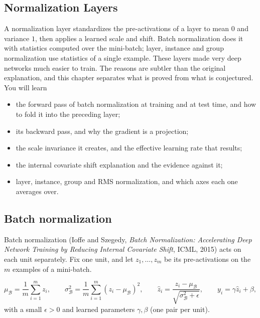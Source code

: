 \begin{notechapter}
\chapter{Normalization Layers}\label{ch:normalization}

\begin{chapterintro}
A normalization layer standardizes the pre-activations of a layer to mean $0$ and variance
$1$, then applies a learned scale and shift. Batch normalization does it with statistics
computed over the mini-batch; layer, instance and group normalization use statistics of a
single example. These layers made very deep networks much easier to train. The reasons are
subtler than the original explanation, and this chapter separates what is proved from what
is conjectured. You will learn
\begin{itemize}[nosep]
  \item the forward pass of batch normalization at training and at test time, and how to fold it
        into the preceding layer;
  \item its backward pass, and why the gradient is a projection;
  \item the scale invariance it creates, and the effective learning rate that results;
  \item the internal covariate shift explanation and the evidence against it;
  \item layer, instance, group and RMS normalization, and which axes each one averages over.
\end{itemize}
\end{chapterintro}

\section{Batch normalization}\label{normalization:sec:bn}

Batch normalization (Ioffe and Szegedy, \emph{Batch Normalization: Accelerating Deep Network
Training by Reducing Internal Covariate Shift}, ICML, 2015) acts on each unit separately.
Fix one unit, and let $z_1,\dots,z_m$ be its pre-activations on the $m$ examples of a mini-batch.

\begin{definition}\label{normalization:def:bn}
\[
  \mu_{\mathcal B} = \frac1m\sum_{i=1}^mz_i,\qquad\sigma_{\mathcal B}^2 = \frac1m\sum_{i=1}^m(z_i - \mu_{\mathcal B})^2,\qquad
  \hat z_i = \frac{z_i - \mu_{\mathcal B}}{\sqrt{\sigma_{\mathcal B}^2 + \epsilon}},\qquad y_i = \gamma\hat z_i + \beta,
\]
with a small $\epsilon>0$ and learned parameters $\gamma,\beta$ (one pair per unit).
\end{definition}


\end{notechapter}
